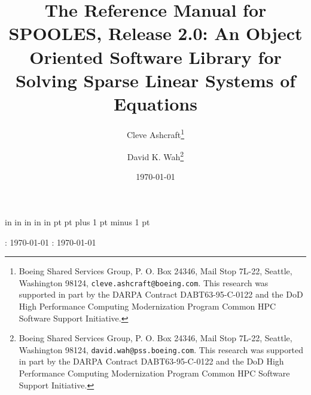%
%

 in
 in
 in
 in
 in
 pt
 pt plus 1 pt minus 1 pt



\newcommand{\bfi}{{\bf i}}
\newcommand{\bfj}{{\bf j}}
\newcommand{\bnd}[1]{{\partial{#1}}}

\pagestyle{myheadings}
\markboth
{\quad \hrulefill {} : \today \quad \hrulefill}
{\quad \hrulefill {} : \quad \today \hrulefill}





\title{
       The Reference Manual for {\bf SPOOLES}, Release 2.0: \break
       An Object Oriented Software Library for Solving \break
       Sparse Linear Systems of Equations}
\author{
   Cleve Ashcraft\thanks{
   Boeing Shared Services Group,
   P. O. Box 24346,
   Mail Stop 7L-22,
   Seattle, Washington 98124,
   {\tt cleve.ashcraft@boeing.com}.
   This research was supported in part by the DARPA
   Contract DABT63-95-C-0122 and the DoD High Performance Computing
   Modernization Program Common HPC Software Support Initiative.}
 \and 
 David K. Wah\thanks{
   Boeing Shared Services Group,
   P. O. Box 24346,
   Mail Stop 7L-22,
   Seattle, Washington 98124,
   {\tt david.wah@pss.boeing.com}.
   This research was supported in part by the DARPA
   Contract DABT63-95-C-0122 and the DoD High Performance Computing
   Modernization Program Common HPC Software Support Initiative.}
}
\date{\today}
\maketitle

